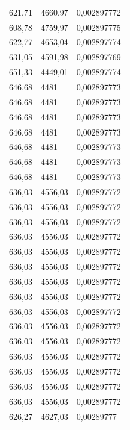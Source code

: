 \begin{center}
\begin{longtable}{|l|l|l|}
621,71            & 4660,97           & 0,002897772 \\
608,78            & 4759,97           & 0,002897775 \\
622,77            & 4653,04           & 0,002897774 \\
631,05            & 4591,98           & 0,002897769 \\
651,33            & 4449,01           & 0,002897774 \\
646,68            & 4481              & 0,002897773 \\
646,68            & 4481              & 0,002897773 \\
646,68            & 4481              & 0,002897773 \\
646,68            & 4481              & 0,002897773 \\
646,68            & 4481              & 0,002897773 \\
646,68            & 4481              & 0,002897773 \\
646,68            & 4481              & 0,002897773 \\
636,03            & 4556,03           & 0,002897772 \\
636,03            & 4556,03           & 0,002897772 \\
636,03            & 4556,03           & 0,002897772 \\
636,03            & 4556,03           & 0,002897772 \\
636,03            & 4556,03           & 0,002897772 \\
636,03            & 4556,03           & 0,002897772 \\
636,03            & 4556,03           & 0,002897772 \\
636,03            & 4556,03           & 0,002897772 \\
636,03            & 4556,03           & 0,002897772 \\
636,03            & 4556,03           & 0,002897772 \\
636,03            & 4556,03           & 0,002897772 \\
636,03            & 4556,03           & 0,002897772 \\
636,03            & 4556,03           & 0,002897772 \\
636,03            & 4556,03           & 0,002897772 \\
636,03            & 4556,03           & 0,002897772 \\
626,27            & 4627,03           & 0,00289777  \\

\end{longtable}
\end{center}
